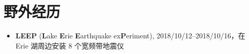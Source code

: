 \section{野外经历}

\begin{itemize}
\item \textbf{LEEP} (\textbf{L}ake \textbf{E}rie \textbf{E}arthquake ex\textbf{P}eriment),
      2018/10/12--2018/10/16，在 Erie 湖周边安装 8 个宽频带地震仪
\end{itemize}
